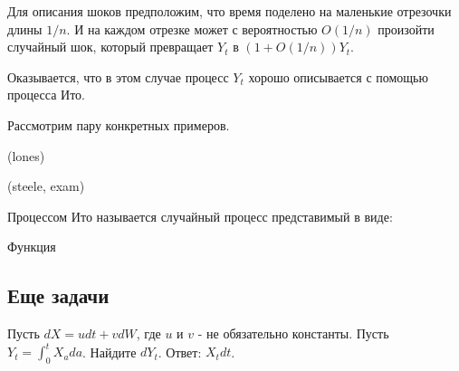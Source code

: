 {Для описания шоков предположим, что время поделено на маленькие отрезочки длины $1/n$. И на каждом отрезке может с вероятностью $O(1/n)$ произойти случайный шок, который превращает $Y_{t}$ в $(1+O(1/n))Y_{t}$.

Оказывается, что в этом случае процесс $Y_{t}$ хорошо описывается с помощью процесса Ито. 

Рассмотрим пару конкретных примеров.

(lones)


(steele, exam)




\begin{mydef}
Процессом Ито называется случайный процесс представимый в виде: 

\end{mydef}

Функция 










}\subsection{Еще задачи}


Пусть $dX=udt+vdW$, где $u$ и $v$ - не обязательно константы. Пусть $Y_{t}=\int_{0}^{t}X_{a}da$. Найдите $dY_{t}$.
Ответ: $X_{t}dt$.


